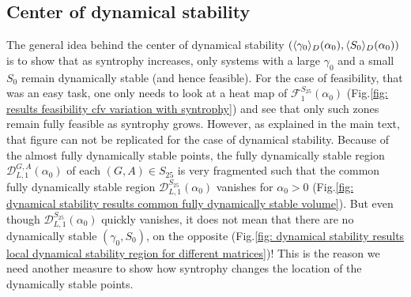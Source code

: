 \documentclass[12pt]{report}
\begin{document}
\subsection{Center of dynamical stability}\label{app : center of gravity local dynamical stability}
The general idea behind the center of dynamical stability $(\langle \gamma_0 \rangle_D(\alpha_0), \langle S_0 \rangle_D(\alpha_0))$ is to show that as syntrophy increases, only systems with a large $\gamma_0$ and a small $S_0$ remain dynamically stable (and hence feasible). For the case of feasibility, that was an easy task, one only needs to look at a heat map of $\mathcal{F}^{S_{25}}_1(\alpha_0)$ (Fig.\ref{fig: results feasibility cfv variation with syntrophy}) and see that only such zones remain fully feasible as syntrophy grows. However, as explained in the main text, that figure can not be replicated for the case of dynamical stability. Because of the almost fully dynamically stable points, the fully dynamically stable region $\mathcal{D}_{L,1}^{G,A}(\alpha_0)$ of each $(G,A) \in S_{25}$ is very fragmented such that the common fully dynamically stable region $\mathcal{D}_{L,1}^{S_{25}}(\alpha_0)$ vanishes for $\alpha_0 > 0$ (Fig.\ref{fig: dynamical stability results common fully dynamically stable volume}). But even though $\mathcal{D}_{L,1}^{S_{25}}(\alpha_0)$ quickly vanishes, it does not mean that there are no dynamically stable $(\gamma_0, S_0)$, on the opposite (Fig.\ref{fig: dynamical stability results local dynamical stability region for different matrices})! This is the reason we need another measure to show how syntrophy changes the location of the dynamically stable points.
\end{document}
